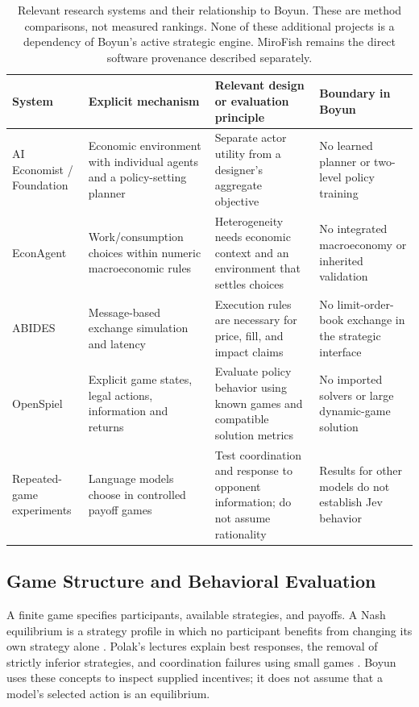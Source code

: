 \begin{table}[t]
\caption{Relevant research systems and their relationship to Boyun. These are
method comparisons, not measured rankings. None of these additional projects
is a dependency of Boyun's active strategic engine. MiroFish remains the direct
software provenance described separately.}
\label{tab:economic-related}
\centering\footnotesize
\begin{tabularx}{\textwidth}{@{}p{}p{}YY@{}}
\toprule System & Explicit mechanism & Relevant design or evaluation principle & Boundary in Boyun \\
\midrule
AI Economist / Foundation \cite{zheng2020} & Economic environment with individual agents and a policy-setting planner & Separate actor utility from a designer's aggregate objective & No learned planner or two-level policy training \\
EconAgent \cite{li2024econagent} & Work/consumption choices within numeric macroeconomic rules & Heterogeneity needs economic context and an environment that settles choices & No integrated macroeconomy or inherited validation \\
ABIDES \cite{byrd2019} & Message-based exchange simulation and latency & Execution rules are necessary for price, fill, and impact claims & No limit-order-book exchange in the strategic interface \\
OpenSpiel \cite{lanctot2019} & Explicit game states, legal actions, information and returns & Evaluate policy behavior using known games and compatible solution metrics & No imported solvers or large dynamic-game solution \\
Repeated-game experiments \cite{akata2025} & Language models choose in controlled payoff games & Test coordination and response to opponent information; do not assume rationality & Results for other models do not establish Jev behavior \\
\bottomrule
\end{tabularx}
\end{table}

\subsection{Game Structure and Behavioral Evaluation}
A finite game specifies participants, available strategies, and payoffs.
A Nash equilibrium is a strategy profile in which no participant benefits
from changing its own strategy alone \cite{nash1950}. Polak's lectures explain
best responses, the removal of strictly inferior strategies, and coordination
failures using small games \cite{polak3,polak5}. Boyun uses these concepts to
inspect supplied incentives; it does not assume that a model's selected
action is an equilibrium.

